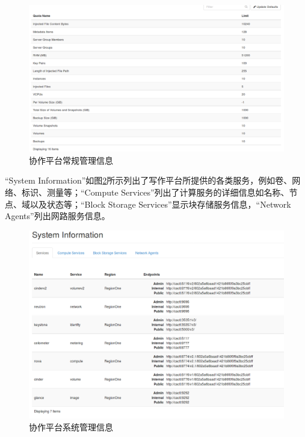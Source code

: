 \documentclass[12pt]{article}
\begin{document}
\begin{figure}[!htb]
\centering
\includegraphics[width=6in]{./figures/Admin_System_Defaults}
\caption{协作平台常规管理信息}
\label{fig:adminsystemdefaults}
\end{figure}

``System Information''如图\ref{fig:adminsystemsysteminformation}所示列出了写作平台所提供的各类服务，例如卷、网络、标识、测量等；``Compute Services''列出了计算服务的详细信息如名称、节点、域以及状态等；``Block Storage Services''显示块存储服务信息，``Network Agents''列出网路服务信息。
\begin{figure}[!htb]
\centering
\includegraphics[width=6in]{./figures/Admin_System_SystemInformation}
\caption{协作平台系统管理信息}
\label{fig:adminsystemsysteminformation}
\end{figure}
\end{document}
